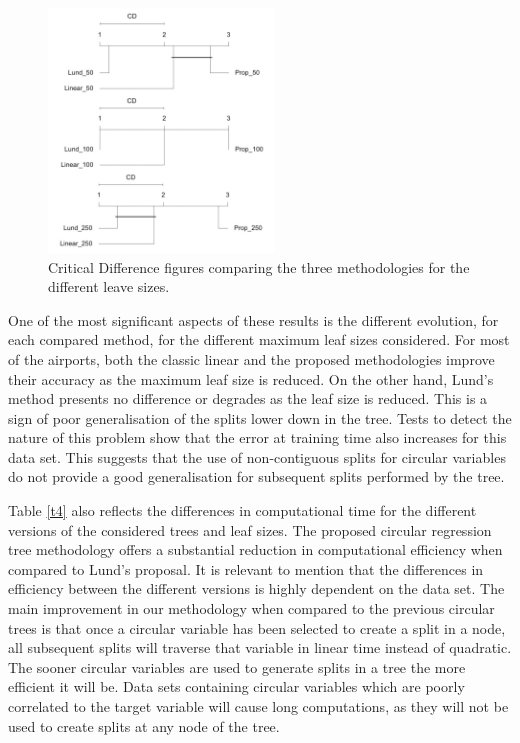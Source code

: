 \documentclass[times,twocolumn,final,authoryear]{elsarticle}
\begin{document}
\begin{figure}
\centering
\parbox{5cm}{
\includegraphics[width=6cm]{CD.pdf}}
\qquad
\caption{Critical Difference figures comparing the three methodologies for the different leave sizes.}
\label{f7}
\end{figure}

One of the most significant aspects of these results is the different evolution, for each compared method, for the different maximum leaf sizes considered. For most of the airports, both the classic linear and the proposed methodologies improve their accuracy as the maximum leaf size is reduced. On the other hand, Lund's method presents no difference or degrades as the leaf size is reduced. This is a sign of poor generalisation of the splits lower down in the tree. Tests to detect the nature of this problem show that the error at training time also increases for this data set. This suggests that the use of non-contiguous splits for circular variables do not provide a good generalisation for subsequent splits performed by the tree.

Table \ref{t4} also reflects the differences in computational time for the different versions of the considered trees and leaf sizes. The proposed circular regression tree methodology offers a substantial reduction in computational efficiency when compared to Lund's proposal. It is relevant to mention that the differences in efficiency between the different versions is highly dependent on the data set. The main improvement in our methodology when compared to the previous circular trees is that once a circular variable has been selected to create a split in a node, all subsequent splits will traverse that variable in linear time instead of quadratic. The sooner circular variables are used to generate splits in a tree the more efficient it will be. Data sets containing circular variables which are poorly correlated to the target variable will cause long computations, as they will not be used to create splits at any node of the tree. 
\end{document}
